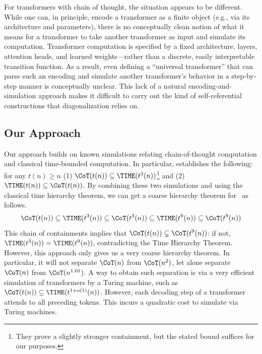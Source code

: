 For transformers with chain of thought, the situation appears to be different. While one can, in principle, encode a transformer as a finite object (e.g., via its architecture and parameters), there is no conceptually clean notion of what it means for a transformer to take another transformer as input and simulate its computation. Transformer computation is specified by a fixed architecture, layers, attention heads, and learned weights—rather than a discrete, easily interpretable transition function. As a result, even defining a “universal transformer” that can parse such an encoding and simulate another transformer’s behavior in a step-by-step manner is conceptually unclear. This lack of a natural encoding-and-simulation approach makes it difficult to carry out the kind of self-referential constructions that diagonalization relies on.




\subsection{Our Approach}

Our approach builds on known simulations relating chain-of-thought computation and classical time-bounded computation. In particular, \cite{merrill2023expressive} establishes the following: for any $t(n) \geq n$ (1) $\CoT(t(n)) \subseteq \TIME(t^3(n))$\footnote{They prove a slightly stronger containment, but the stated bound suffices for our purposes.} and (2) $\TIME(t(n)) \subseteq \CoT(t(n))$. By combining these two simulations and using the classical time hierarchy theorem, we can get a coarse hierarchy theorem for \CoT\ as follows. 
\[\CoT(t(n)) \subseteq \TIME(t^3(n)) \subseteq \CoT(t^3(n)) \subseteq \TIME(t^{9}(n)) \subseteq \CoT(t^9(n)) \]
This chain of containments implies that $\CoT(t(n)) \subsetneq \CoT(t^9(n))$: if not, $\TIME(t^3(n)) = \TIME(t^9(n))$, contradicting the Time Hierarchy Theorem. However, this approach only gives us a very coarse hierarchy theorem. In particular, it will not separate $\CoT(n)$ from $\CoT(n^2)$, let alone separate $\CoT(n)$ from $\CoT(n^{1.01})$. A way to obtain such separation is via a very efficient simulation of transformers by a Turing machine, such as $\CoT(t(n)) \subseteq \TIME(t^{1+o(1)}(n))$.  However, each decoding step of a transformer attends to all preceding tokens. This incurs a quadratic cost to simulate via Turing machines.


